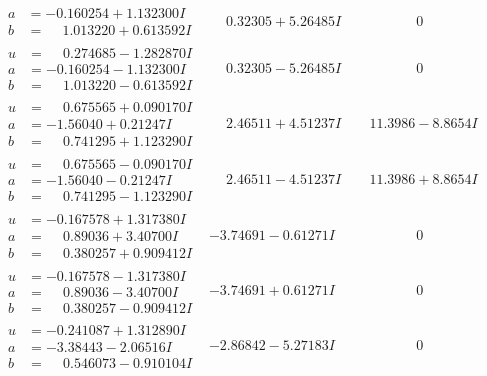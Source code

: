 \documentclass[1p]{elsarticle_modified}
\theoremstyle{definition}
\begin{document}
$$\begin{array}{c|c|c}
\begin{aligned}
a &= -0.160254 + 1.132300 I \\
b &= \phantom{-}1.013220 + 0.613592 I\end{aligned}
 & \phantom{-}0.32305 + 5.26485 I & \phantom{-0.000000 } 0 \\ \hline\begin{aligned}
u &= \phantom{-}0.274685 - 1.282870 I \\
a &= -0.160254 - 1.132300 I \\
b &= \phantom{-}1.013220 - 0.613592 I\end{aligned}
 & \phantom{-}0.32305 - 5.26485 I & \phantom{-0.000000 } 0 \\ \hline\begin{aligned}
u &= \phantom{-}0.675565 + 0.090170 I \\
a &= -1.56040 + 0.21247 I \\
b &= \phantom{-}0.741295 + 1.123290 I\end{aligned}
 & \phantom{-}2.46511 + 4.51237 I & \phantom{-}11.3986 - 8.8654 I \\ \hline\begin{aligned}
u &= \phantom{-}0.675565 - 0.090170 I \\
a &= -1.56040 - 0.21247 I \\
b &= \phantom{-}0.741295 - 1.123290 I\end{aligned}
 & \phantom{-}2.46511 - 4.51237 I & \phantom{-}11.3986 + 8.8654 I \\ \hline\begin{aligned}
u &= -0.167578 + 1.317380 I \\
a &= \phantom{-}0.89036 + 3.40700 I \\
b &= \phantom{-}0.380257 + 0.909412 I\end{aligned}
 & -3.74691 - 0.61271 I & \phantom{-0.000000 } 0 \\ \hline\begin{aligned}
u &= -0.167578 - 1.317380 I \\
a &= \phantom{-}0.89036 - 3.40700 I \\
b &= \phantom{-}0.380257 - 0.909412 I\end{aligned}
 & -3.74691 + 0.61271 I & \phantom{-0.000000 } 0 \\ \hline\begin{aligned}
u &= -0.241087 + 1.312890 I \\
a &= -3.38443 - 2.06516 I \\
b &= \phantom{-}0.546073 - 0.910104 I\end{aligned}
 & -2.86842 - 5.27183 I & \phantom{-0.000000 } 0 \\ \hline\begin{aligned}

\end{aligned}
\end{array}$$
\end{document}
